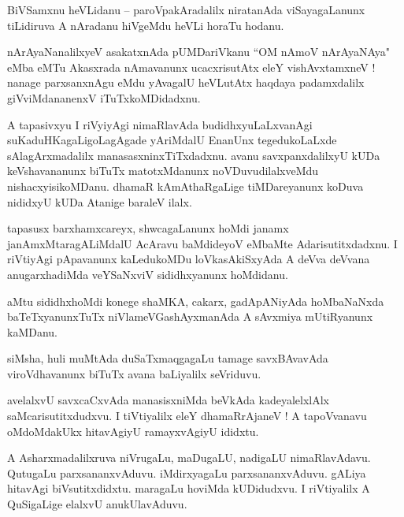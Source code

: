 \documentclass{article}
\begin{document}
\begin{mn}%
BiVSamxnu heVLidanu -- paroVpakAradalilx niratanAda viSayagaLanunx tiLidiruva A nAradanu hiVgeMdu 
heVLi horaTu hodanu.
\end{mn}

\begin{mn}%
nArAyaNanalilxyeV asakatxnAda pUMDariVkanu ``OM nAmoV nArAyaNAya" eMba eMTu Akasxrada nAmavanunx 
ucacxrisutAtx eleY vishAvxtamxneV ! nanage parxsanxnAgu eMdu yAvagalU heVLutAtx haqdaya 
padamxdalilx giVviMdananenxV iTuTxkoMDidadxnu.
\end{mn}

\begin{mn}%
A tapasivxyu I riVyiyAgi nimaRlavAda budidhxyuLaLxvanAgi suKaduHKagaLigoLagAgade yAriMdalU EnanUnx 
tegedukoLaLxde sAlagArxmadalilx manasasxninxTiTxdadxnu. avanu savxpanxdalilxyU kUDa keVshavananunx 
biTuTx matotxMdanunx noVDuvudilalxveMdu nishacxyisikoMDanu. dhamaR kAmAthaRgaLige tiMDareyanunx 
koDuva nididxyU kUDa Atanige baraleV ilalx.
\end{mn}

\begin{mn}%
tapasusx barxhamxcareyx, shwcagaLanunx hoMdi janamx janAmxMtaragALiMdalU AcAravu baMdideyoV eMbaMte 
Adarisutitxdadxnu. I riVtiyAgi pApavanunx kaLedukoMDu loVkasAkiSxyAda A deVva deVvana 
anugarxhadiMda veYSaNxviV sididhxyanunx hoMdidanu.
\end{mn}

\begin{mn}%
aMtu sididhxhoMdi konege shaMKA, cakarx, gadApANiyAda hoMbaNaNxda baTeTxyanunxTuTx 
niVlameVGashAyxmanAda A sAvxmiya mUtiRyanunx kaMDanu.
\end{mn}

\begin{mn}%
siMsha, huli muMtAda duSaTxmaqgagaLu tamage savxBAvavAda viroVdhavanunx biTuTx avana baLiyalilx 
seVriduvu.
\end{mn}

\begin{mn}%
avelalxvU savxcaCxvAda manasisxniMda beVkAda kadeyalelxlAlx saMcarisutitxdudxvu. I tiVtiyalilx eleY 
dhamaRrAjaneV ! A tapoVvanavu oMdoMdakUkx hitavAgiyU ramayxvAgiyU ididxtu.
\end{mn}

\begin{mn}%
A Asharxmadalilxruva niVrugaLu, maDugaLU, nadigaLU nimaRlavAdavu. QutugaLu parxsananxvAduvu. 
iMdirxyagaLu parxsananxvAduvu. gALiya hitavAgi biVsutitxdidxtu. maragaLu hoviMda kUDidudxvu. I 
riVtiyalilx A QuSigaLige elalxvU anukUlavAduvu.
\end{mn}
\end{document}
